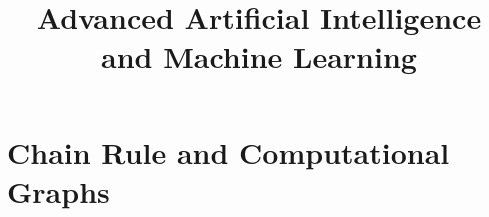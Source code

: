 




\newcommand{\titlefigure}{figure/backprop_gg_new.png}
\newcommand{\learninggoals}{
  \item Computational graphs and the chain rule as the mathematical basis of backpropagation
  \item The forward and backward pass, worked through a concrete example
  \item General backpropagation formalism via recursive application of the chain rule
  \item Why and how to initialize network weights and biases
  \item Optimization challenges in deep networks: ill-conditioning, local minima, saddle points, cliffs/exploding gradients
}

\title{Advanced Artificial Intelligence and Machine Learning}
\date{}




\section{Chain Rule and Computational Graphs}

